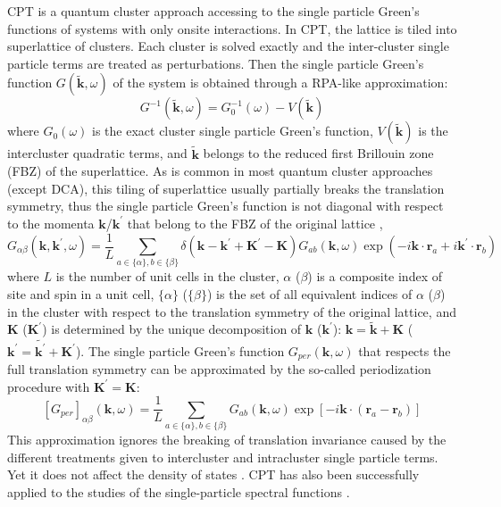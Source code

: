 \documentclass[12pt]{iopart}
\begin{document}
\par CPT \cite{SPP_PRL2000} is a quantum cluster approach accessing to the single particle Green's functions of systems with only onsite interactions. In CPT, the lattice is tiled into superlattice of clusters. Each cluster is solved exactly and the inter-cluster single particle terms are treated as perturbations. Then the single particle Green's function $G(\widetilde{\mathbf{k}},\omega)$ of the system is obtained through a RPA-like approximation:
\begin{equation}\label{SPGF}
  G^{-1}(\widetilde{\mathbf{k}},\omega)=G_0^{-1}(\omega)-V(\widetilde{\mathbf{k}})
\end{equation}
where $G_0(\omega)$ is the exact cluster single particle Green's function, $V(\widetilde{\mathbf{k}})$ is the intercluster quadratic terms, and $\widetilde{\mathbf{k}}$ belongs to the reduced first Brillouin zone (FBZ) of the superlattice. As is common in most quantum cluster approaches (except DCA), this tiling of superlattice usually partially breaks the translation symmetry, thus the single particle Green's function is not diagonal with respect to the momenta $\mathbf{k}$/$\mathbf{k}^\prime$ that belong to the FBZ of the original lattice \cite{S_arXiv2008},
\begin{equation}\label{FT}
G_{\alpha\beta}(\mathbf{k},\mathbf{k}^\prime,\omega)=\frac{1}{L}\sum_{a\in\{\alpha\},b\in\{\beta\}}
\delta(\mathbf{k}-\mathbf{k}^\prime+\mathbf{K}^\prime-\mathbf{K}) G_{ab}(\mathbf{k},\omega) \exp\left(-i\mathbf{k}\cdot\mathbf{r}_a+i\mathbf{k}^\prime\cdot\mathbf{r}_b\right)
\end{equation}
where $L$ is the number of unit cells in the cluster, $\alpha$ ($\beta$) is a composite index of site and spin in a unit cell, $\{\alpha\}$ ($\{\beta\}$) is the set of all equivalent indices of $\alpha$ ($\beta$) in the cluster with respect to the translation symmetry of the original lattice, and $\mathbf{K}$ ($\mathbf{K}^\prime$) is determined by the unique decomposition of $\mathbf{k}$ ($\mathbf{k}^\prime$): $\mathbf{k}=\widetilde{\mathbf{k}}+\mathbf{K}$ ($\mathbf{k}^\prime=\widetilde{\mathbf{k}^\prime}+\mathbf{K}^\prime$). The single particle Green's function $G_{per}(\mathbf{k},\omega)$ that respects the full translation symmetry can be approximated by the so-called periodization procedure with $\mathbf{K}^\prime=\mathbf{K}$:
\begin{equation}\label{PP}
\left[G_{per}\right]_{\alpha\beta}(\mathbf{k},\omega)=
\frac{1}{L}\sum_{a\in\{\alpha\},b\in\{\beta\}}G_{ab}(\mathbf{k},\omega)\exp\left[-i \mathbf{k}\cdot(\mathbf{r}_a-\mathbf{r}_b)\right]
\end{equation}
This approximation ignores the breaking of translation invariance caused by the different treatments given to intercluster and intracluster single particle terms. Yet it does not affect the density of states \cite{S_arXiv2008}. CPT has also been successfully applied to the studies of the single-particle spectral functions \cite{SPP_PRL2000,ST_PRL2004,KYXL_PRB2011,YXL_PRL2011,YL_PRB2012,LYXL_PRB2014}.
\end{document}
